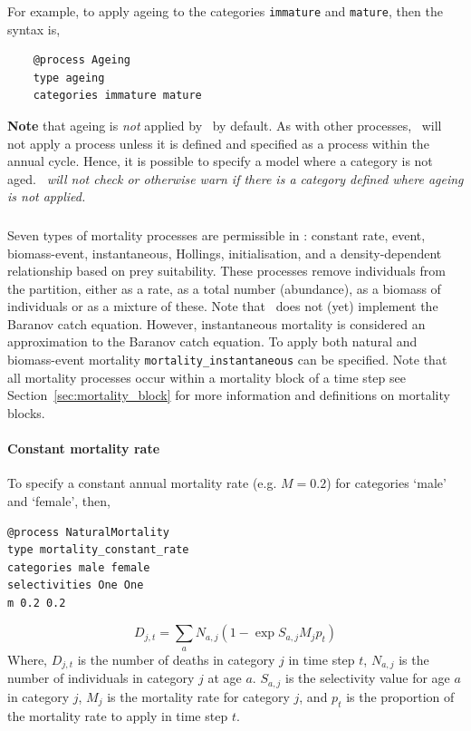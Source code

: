 For example, to apply ageing to the categories \texttt{immature} and \texttt{mature}, then the syntax is,

{\small{\begin{verbatim}
	@process Ageing
	type ageing
	categories immature mature
	\end{verbatim}}}

\textbf{Note} that ageing is \emph{not} applied by \CNAME\ by default. As with other processes, \CNAME\ will not apply a process unless it is defined and specified as a process within the annual cycle. Hence, it is possible to specify a model where a category is not aged. \emph{\CNAME\ will not check or otherwise warn if there is a category defined where ageing is not applied.}

\subsubsection{\label{sec:mortality}}

Seven types of mortality processes are permissible in \CNAME: constant rate, event, biomass-event, instantaneous, Hollings, initialisation, and a density-dependent relationship based on prey suitability. These processes remove individuals from the partition, either as a rate, as a total number (abundance), as a biomass of individuals or as a mixture of these. Note that \CNAME\ does not (yet) implement the Baranov catch equation. However, instantaneous mortality is considered an approximation to the Baranov catch equation. To apply both natural and biomass-event mortality \texttt{mortality\_instantaneous} can be specified. Note that all mortality processes occur within a mortality block of a time step see Section~\ref{sec:mortality_block} for more information and definitions on mortality blocks. 

\paragraph{Constant mortality rate}
To specify a constant annual mortality rate (e.g. $M=0.2$) for categories `male' and `female', then, 
{\small{\begin{verbatim}
@process NaturalMortality
type mortality_constant_rate
categories male female
selectivities One One
m 0.2 0.2

\end{verbatim}}}

\begin{equation}
D_{j,t} = \sum_a N_{a,j} (1 - \exp{S_{a,j} M_j p_t})
\end{equation}
Where, $D_{j,t}$ is the number of deaths in category $j$ in time step $t$, $N_{a,j}$ is the number of individuals in category $j$ at age $a$. $S_{a,j}$ is the selectivity value for age $a$ in category $j$, $M_j$ is the mortality rate for category $j$, and $p_t$ is the proportion of the mortality rate to apply in time step $t$.

